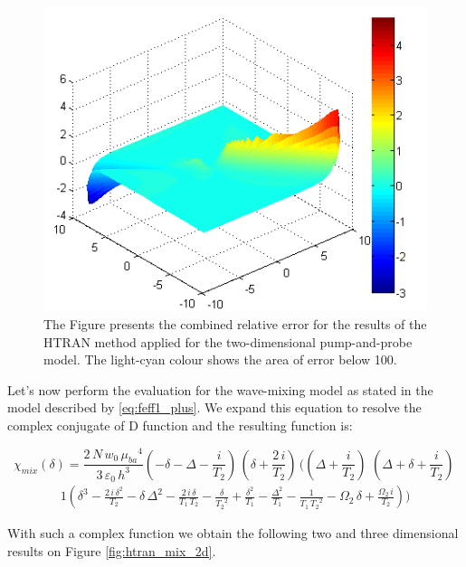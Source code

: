 \documentclass[12pt,twoside,a4paper]{article}
\numberwithin{equation}{subsection}
\numberwithin{figure}{subsection}
\begin{document}
\begin{figure}
  \includegraphics{img/htran_pnp_3derr.png}
  \caption{The Figure presents the combined relative error for the results of the HTRAN method applied for the two-dimensional
  pump-and-probe model. The light-cyan colour shows the area of error below 100. \label{fig:htran_pnp_3derr}}
\end{figure} %

Let's now perform the evaluation for the wave-mixing model as stated in the model described by \ref{eq:feff1_plus}. We expand this
equation to resolve the complex conjugate of D function and the resulting function is:

\begin{equation} \label{eq:htran_feffexp}
  {\chi_{mix}}(\delta ) = 
    \frac{2\,N\,{w_{0}}\,{\mu_{ba}}^{4}}{3\,\varepsilon_0\,h^{3}}( - \delta - \Delta - \frac {i}{{T_{2}}})\,(\delta +
    \frac{2\,i}{{T_{2}}})\,((\Delta + \frac {i}{{T_{2}}})\,\,(\Delta + \delta + \frac {i}{{T_{2}}})\,
\end{equation}
\begin{alignat*}{1}
  (\delta ^{3} - \frac
    {2\,i\,\delta ^{2}}{{T _{2}}} - \delta \,\Delta ^{2} - \frac {2\,i\,\delta }{{T_{1}}\,{T_{2}}} - \frac {\delta }{{T_{2}}^{2}} +
    \frac {\delta ^{2}}{{T_{1 }}} - \frac {\Delta ^{2}}{{T_{1}}} - \frac {1}{{T_{1}}\,{T_{2}}^{2}} - {\Omega_{2}}\,\delta  + \frac
    {{\Omega_{2}}\,i}{{T_{2}}}) )
\end{alignat*}

With such a complex function we obtain the following two and three dimensional results on Figure \ref{fig:htran_mix_2d}.
 
\end{document}
